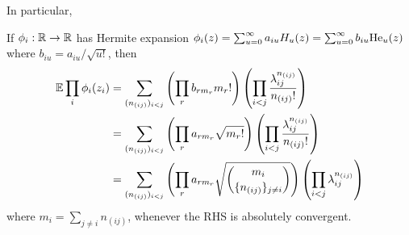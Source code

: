 \documentclass[main.tex]{subfiles}
\begin{document}
In particular, 
\begin{thm}\label{thm:multivariateHermiteExpectation}
If $\phi_i: \mathbb{R} \to \mathbb{R}$ has Hermite expansion $\phi_i(z) = \sum_{u=0}^\infty a_{iu} H_u(z) = \sum_{u=0}^\infty b_{iu} \mathrm{He}_u(z)$ where $b_{iu} = a_{iu}/\sqrt{u!}$, then
\begin{align*}
    \operatorname*{\mathbb{E}} \prod_i \phi_i(z_i)
        &=
            \sum_{(n_{(ij)})_{i<j}}
                \left( \prod_r b_{r m_r} m_r! \right) 
                \left( \prod_{i<j} \frac{\lambda_{ij}^{n_{(ij)}}}{n_{(ij)}!}
                    \right)
            \\
        &=
            \sum_{(n_{(ij)})_{i<j}}
                \left( \prod_r a_{r m_r} \sqrt{m_r!} \right) 
                \left( \prod_{i<j} \frac{\lambda_{ij}^{n_{(ij)}}}{n_{(ij)}!}
                    \right)
            \\
        &=
            \sum_{(n_{(ij)})_{i<j}}
                \left( \prod_r a_{r m_r} \sqrt{\binom{m_i}{\{n_{(ij)}\}_{j \ne i}}} \right) 
                \left( \prod_{i<j} \lambda_{ij}^{n_{(ij)}}
                    \right)
\end{align*}
where $m_i = \sum_{j\ne i} n_{(ij)}$, whenever the RHS is absolutely convergent.
\end{thm}
\end{document}
